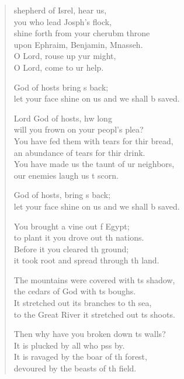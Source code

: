 \settowidth{\versewidth}{Men have burnt it with fire and destroyed it. }
\begin{verse}%
  \begin{patverse}
 shepherd of Isrel, hear us,\Med\\
you who lead Josph’s flock,\\
shine forth from your cherub\pointup{\i}m throne\Med\\
upon Ephraim, Benjamin, Mnasseh.\\
O Lord, rouse up yur might,\Med\\
O Lord, come to ur help.

God of hosts bring s back;\Med\\
let your face shine on us and we shall b saved.

Lord God of hosts, hw long\Med\\
will you frown on your peopl’s plea?\\
You have fed them with tears for thir bread,\Med\\
an abundance of tears for thir drink.\\
You have made us the taunt of ur neighbors,\Med\\
our enemies laugh us t scorn.

God of hosts, bring s back;\Med\\
let your face shine on us and we shall b saved.

You brought a vine out f Egypt;\Med\\
to plant it you drove out th nations.\\
Before it you cleared th ground;\Med\\
it took root and spread through th land.

The mountains were covered with \pointup{\i}ts shadow,\Med\\
the cedars of God with \pointup{\i}ts boughs.\\
It stretched out its branches to th sea,\Med\\
to the Great River it stretched out \pointup{\i}ts shoots.

Then why have you broken down \pointup{\i}ts walls?\Med\\
It is plucked by all who pss by.\\
It is ravaged by the boar of th forest,\Med\\
devoured by the beasts of th field.


\end{patverse}
\end{verse}

